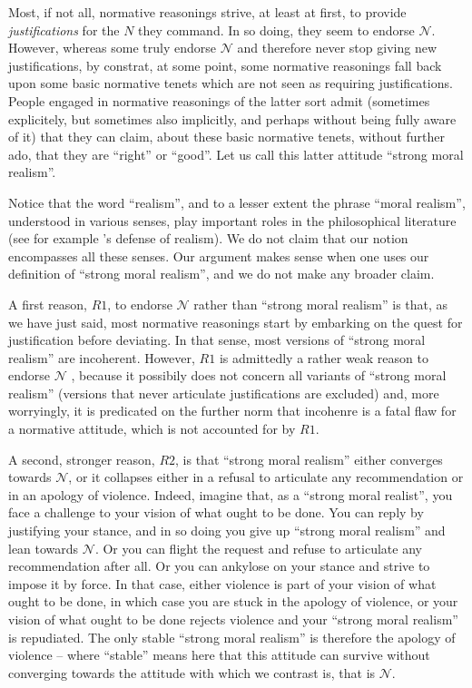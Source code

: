 \documentclass[preprint, french, english, 11pt, authoryear]{elsarticle}%
\newcommand{\adv}{\mathscr{N}}
\begin{document}
Most, if not all, normative reasonings strive, at least at first, to provide \emph{justifications} for the $N$ they command. In so doing, they seem to endorse $\adv$. However, whereas some truly endorse $\adv$ and therefore never stop giving new justifications, by constrat, at some point, some normative reasonings fall back upon some basic normative tenets which are not seen as requiring justifications. People engaged in normative reasonings of the latter sort admit (sometimes explicitely, but sometimes also implicitly, and perhaps without being fully aware of it) that they can claim, about these basic normative tenets, without further ado, that they are ``right'' or ``good''. Let us call this latter attitude ``strong moral realism''.

Notice that the word ``realism'', and to a lesser extent the phrase ``moral realism'', understood in various senses, play important roles in the philosophical literature (see for example \citet{putnam_realism_1992}'s defense of realism). We do not claim that our notion encompasses all these senses. Our argument makes sense when one uses our definition of ``strong moral realism'', and we do not make any broader claim.

A first reason, $R1$, to endorse $\adv$ rather than ``strong moral realism'' is that, as we have just said, most normative reasonings start by embarking on the quest for justification before deviating. In that sense, most versions of ``strong moral realism'' are incoherent. However, $R1$ is admittedly a rather weak reason to endorse $\adv$ , because it possibily does not concern all variants of ``strong moral realism'' (versions that never articulate justifications are excluded) and, more worryingly, it is predicated on the further norm that incohenre is a fatal flaw for a normative attitude, which is not accounted for by $R1$.

A second, stronger reason, $R2$, is that ``strong moral realism'' either converges towards $\adv$, or it collapses either in a refusal to articulate any recommendation or in an apology of violence. Indeed, imagine that, as a ``strong moral realist'', you face a challenge to your vision of what ought to be done. You can reply by justifying your stance, and in so doing you give up ``strong moral realism'' and lean towards $\adv$. Or you can flight the request and refuse to articulate any recommendation after all. Or you can ankylose on your stance and strive to impose it by force. In that case, either violence is part of your vision of what ought to be done, in which case you are stuck in the apology of violence, or your vision of what ought to be done rejects violence and your ``strong moral realism'' is repudiated. The only stable ``strong moral realism'' is therefore the apology of violence -- where ``stable'' means here that this attitude can survive without converging towards the attitude with which we contrast is, that is $\adv$.
\end{document}
